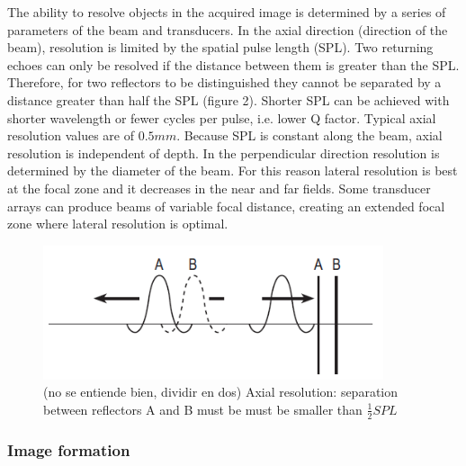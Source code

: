 \documentclass[11pt]{article} %
\begin{document}
	The ability to resolve objects in the acquired image is determined by a series of parameters of the beam and transducers. In the axial direction (direction of the beam), resolution is limited by the spatial pulse length (SPL). Two returning echoes can only be resolved if the distance between them is greater than the SPL. Therefore, for two reflectors to be distinguished they cannot be separated by a distance greater than half the SPL (figure 2). Shorter SPL can be achieved with shorter wavelength or fewer cycles per pulse, i.e. lower Q factor. Typical axial resolution values are of $0.5 mm$. Because SPL is constant along the beam, axial resolution is independent of depth.
In the perpendicular direction resolution is determined by the diameter of the beam. For this reason lateral resolution is best at the focal zone and it decreases in the near and far fields. Some transducer arrays can produce beams of variable focal distance, creating an extended focal zone where lateral resolution is optimal. 

	\begin{figure}
	\centering
	\includegraphics[width=10cm]{figuras/resolution.png}
	\caption{\color{red} (no se entiende bien, dividir en dos) Axial resolution: separation between reflectors A and B must be must 		be smaller than $\frac{1}{2} SPL$ \cite{farr}}
	\end{figure}


\subsubsection{Image formation}
	
\end{document}
